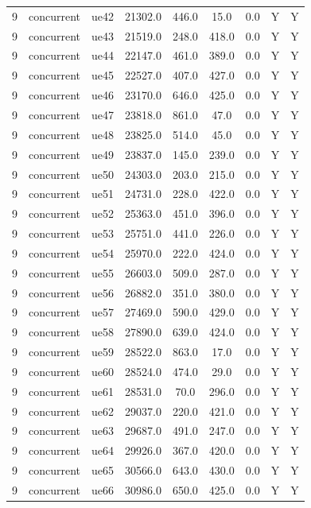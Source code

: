 \begin{table}[ht]
\begin{tabular}{|c|c|c|c|c|c|c|c|c|}
9 & concurrent & ue42 & 21302.0 & 446.0 & 15.0 & 0.0 & Y & Y \\
9 & concurrent & ue43 & 21519.0 & 248.0 & 418.0 & 0.0 & Y & Y \\
9 & concurrent & ue44 & 22147.0 & 461.0 & 389.0 & 0.0 & Y & Y \\
9 & concurrent & ue45 & 22527.0 & 407.0 & 427.0 & 0.0 & Y & Y \\
9 & concurrent & ue46 & 23170.0 & 646.0 & 425.0 & 0.0 & Y & Y \\
9 & concurrent & ue47 & 23818.0 & 861.0 & 47.0 & 0.0 & Y & Y \\
9 & concurrent & ue48 & 23825.0 & 514.0 & 45.0 & 0.0 & Y & Y \\
9 & concurrent & ue49 & 23837.0 & 145.0 & 239.0 & 0.0 & Y & Y \\
9 & concurrent & ue50 & 24303.0 & 203.0 & 215.0 & 0.0 & Y & Y \\
9 & concurrent & ue51 & 24731.0 & 228.0 & 422.0 & 0.0 & Y & Y \\
9 & concurrent & ue52 & 25363.0 & 451.0 & 396.0 & 0.0 & Y & Y \\
9 & concurrent & ue53 & 25751.0 & 441.0 & 226.0 & 0.0 & Y & Y \\
9 & concurrent & ue54 & 25970.0 & 222.0 & 424.0 & 0.0 & Y & Y \\
9 & concurrent & ue55 & 26603.0 & 509.0 & 287.0 & 0.0 & Y & Y \\
9 & concurrent & ue56 & 26882.0 & 351.0 & 380.0 & 0.0 & Y & Y \\
9 & concurrent & ue57 & 27469.0 & 590.0 & 429.0 & 0.0 & Y & Y \\
9 & concurrent & ue58 & 27890.0 & 639.0 & 424.0 & 0.0 & Y & Y \\
9 & concurrent & ue59 & 28522.0 & 863.0 & 17.0 & 0.0 & Y & Y \\
9 & concurrent & ue60 & 28524.0 & 474.0 & 29.0 & 0.0 & Y & Y \\
9 & concurrent & ue61 & 28531.0 & 70.0 & 296.0 & 0.0 & Y & Y \\
9 & concurrent & ue62 & 29037.0 & 220.0 & 421.0 & 0.0 & Y & Y \\
9 & concurrent & ue63 & 29687.0 & 491.0 & 247.0 & 0.0 & Y & Y \\
9 & concurrent & ue64 & 29926.0 & 367.0 & 420.0 & 0.0 & Y & Y \\
9 & concurrent & ue65 & 30566.0 & 643.0 & 430.0 & 0.0 & Y & Y \\
9 & concurrent & ue66 & 30986.0 & 650.0 & 425.0 & 0.0 & Y & Y \\

\end{tabular}
\end{table}
